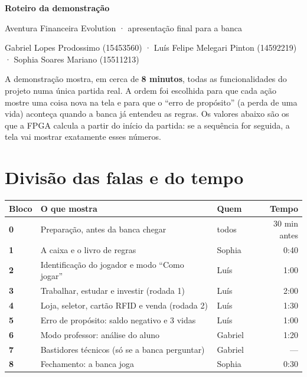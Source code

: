 \documentclass[11pt,a4paper]{article}
\begin{document}
\begin{tcolorbox}[colback=verde,colframe=verde,coltext=white,arc=3mm,left=5mm,right=5mm,top=4mm,bottom=4mm]
  {\Huge\bfseries Roteiro da demonstração}\par\medskip
  {\large Aventura Financeira Evolution · apresentação final para a banca}\par\smallskip
  {\small Gabriel Lopes Prodossimo (15453560) · Luís Felipe Melegari Pinton (14592219) · Sophia Soares Mariano (15511213)}
\end{tcolorbox}

\noindent A demonstração mostra, em cerca de \textbf{8 minutos}, todas as funcionalidades do projeto numa única
partida real. A ordem foi escolhida para que cada ação mostre uma coisa nova na tela e para que o
``erro de propósito'' (a perda de uma vida) aconteça quando a banca já entendeu as regras. Os valores
abaixo são os que a FPGA calcula a partir do início da partida: se a sequência for seguida, a tela vai
mostrar exatamente esses números.

\section{Divisão das falas e do tempo}

\begin{center}
\begin{tabularx}{\linewidth}{@{}>{\bfseries}l X l r@{}}
\toprule
\rowcolor{verdeclaro}Bloco & O que mostra & Quem & Tempo\\
\midrule
0 & Preparação, antes da banca chegar & todos & 30 min antes\\
1 & A caixa e o livro de regras & Sophia & 0:40\\
2 & Identificação do jogador e modo ``Como jogar'' & Luís & 1:00\\
3 & Trabalhar, estudar e investir (rodada 1) & Luís & 2:00\\
4 & Loja, seletor, cartão RFID e venda (rodada 2) & Luís & 1:30\\
5 & Erro de propósito: saldo negativo e 3 vidas & Luís & 1:00\\
6 & Modo professor: análise do aluno & Gabriel & 1:20\\
7 & Bastidores técnicos (só se a banca perguntar) & Gabriel & ---\\
8 & Fechamento: a banca joga & Sophia & 0:30\\
\bottomrule
\end{tabularx}
\end{center}
\end{document}
